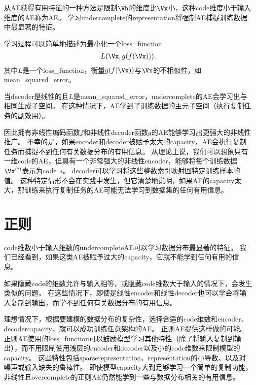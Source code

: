 从\gls{AE}获得有用特征的一种方法是限制$\Vh$的维度比$\Vx$小，这种\gls{code}维度小于输入维度的\gls{AE}称为\gls{AE}。
学习\gls{undercomplete}的\gls{representation}将强制\gls{AE}捕捉训练数据中最显著的特征。


学习过程可以简单地描述为最小化一个\gls{loss_function} 
\begin{align}
    L(\Vx, g(f(\Vx))),
\end{align}
其中$L$是一个\gls{loss_function}，衡量$g(f(\Vx))$与$\Vx$的不相似性，如\gls{mean_squared_error}。


当\gls{decoder}是线性的且$L$是\gls{mean_squared_error}，\gls{undercomplete}的\gls{AE}会学习出与相同生成子空间。
在这种情况下，\gls{AE}学到了训练数据的主元子空间（执行复制任务的副效用）。


因此拥有非线性编码函数$f$和非线性\gls{decoder}函数$g$的\gls{AE}能够学习出更强大的非线性推广。
不幸的是，如果\gls{encoder}和\gls{decoder}被赋予太大的\gls{capacity}，\gls{AE}会执行复制任务而捕捉不到任何有关数据分布的有用信息。
从理论上说，我们可以想象只有一维\gls{code}的\gls{AE}，但具有一个非常强大的非线性\gls{encoder}，能够将每个训练数据$\Vx^{(i)}$表示为\gls{code} $~i$。
\gls{decoder}可以学习将这些整数索引映射回特定训练样本的值。
这种特定情形不会在实践中发生，但它清楚地说明，如果\gls{AE}的\gls{capacity}太大，那训练来执行复制任务的\gls{AE}可能无法学习到数据集的任何有用信息。


\section{正则}
\label{sec:regularized_autoencoders}
\gls{code}维数小于输入维数的\gls{undercomplete}\gls{AE}可以学习数据分布最显著的特征。
我们已经看到，如果这类\gls{AE}被赋予过大的\gls{capacity}，它就不能学到任何有用的信息。


如果隐藏\gls{code}的维数允许与输入相等，或隐藏\gls{code}维数大于输入的情况下，会发生类似的问题。
在这些情况下，即使是线性\gls{encoder}和线性\gls{decoder}也可以学会将输入复制到输出，而学不到任何有关数据分布的有用信息。


理想情况下，根据要建模的数据分布的复杂性，选择合适的\gls{code}维数和\gls{encoder}、\gls{decoder}\gls{capacity}，就可以成功训练任意架构的\gls{AE}。
正则\gls{AE}提供这样做的可能。
正则\gls{AE}使用的\gls{loss_function}可以鼓励模型学习其他特性（除了将输入复制到输出），而不用限制使用浅层的\gls{encoder}和\gls{decoder}以及小的\gls{code}维数来限制模型的\gls{capacity}。
这些特性包括\gls{sparse}\gls{representation}、\gls{representation}的小导数、以及对噪声或输入缺失的鲁棒性。
即使模型\gls{capacity}大到足够学习一个简单的复制功能，非线性且\gls{overcomplete}的正则\gls{AE}仍然能学到一些与数据分布相关的有用信息。


